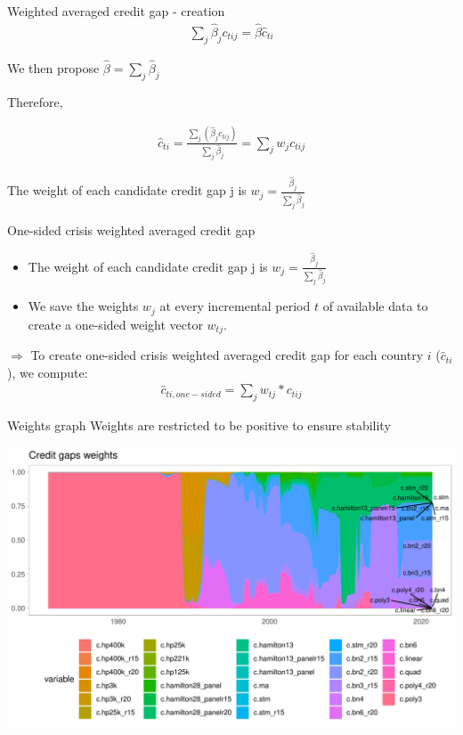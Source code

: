 \documentclass[
  ignorenonframetext,
]{beamer}
\begin{document}
\begin{frame}{Weighted averaged credit gap - creation}
\protect\hypertarget{weighted-averaged-credit-gap---creation}{}
\begin{align*}
\sum\limits_j \hat{\beta}_j c_{tij} = \hat{\beta} \hat{c}_{ti}
\end{align*}

We then propose \(\hat{\beta} = \sum\nolimits_j \hat{\beta}_j\)

Therefore,

\begin{align}
\hat{c}_{ti} = \frac{\sum\nolimits_j (\hat{\beta}_j c_{tij})}{\sum\nolimits_j\hat{\beta}_j} = \sum\nolimits_j w_j c_{tij}
\end{align}

The weight of each candidate credit gap j is
\(w_j = \frac{\hat{\beta}_j}{\sum\nolimits_j\hat{\beta}_j}\)
\end{frame}

\begin{frame}{One-sided crisis weighted averaged credit gap}
\protect\hypertarget{one-sided-crisis-weighted-averaged-credit-gap}{}
\begin{itemize}
\item
  The weight of each candidate credit gap j is
  \(w_j = \frac{\hat{\beta}_j}{\sum\nolimits_j\hat{\beta}_j}\)
\item
  We save the weights \(w_j\) at every incremental period \(t\) of
  available data to create a one-sided weight vector \(w_{tj}\).
\end{itemize}

\(\Rightarrow\) To create one-sided crisis weighted averaged credit gap
for each country \(i\) (\(\hat{c}_{ti}\)), we compute: \begin{align}
\hat{c}_{ti,one-sided} = \sum\nolimits_{j} w_{tj} * c_{tij}
\end{align}
\end{frame}

\begin{frame}{Weights graph}
\protect\hypertarget{weights-graph}{}
Weights are restricted to be positive to ensure stability

\begin{center}\includegraphics[width=1\linewidth]{../Data/Output/Graphs/Weights_stack} \end{center}
\end{frame}
\end{document}
